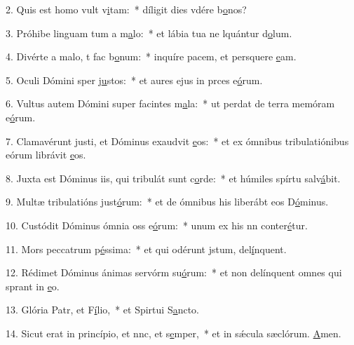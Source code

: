 2. Quis est homo  vult v\uline{i}tam:~* díligit dies vdére b\uline{o}nos?\par 
3. Próhibe linguam tum a m\uline{a}lo:~* et lábia tua ne lquántur d\uline{o}lum.\par 
4. Divérte a malo, t fac b\uline{o}num:~* inquíre pacem, et persquere \uline{e}am.\par 
5. Oculi Dómini sper j\uline{u}stos:~* et aures ejus in prces e\uline{ó}rum.\par 
6. Vultus autem Dómini super facintes m\uline{a}la:~* ut perdat de terra memóram e\uline{ó}rum.\par 
7. Clamavérunt justi, et Dóminus exaudvit \uline{e}os:~* et ex ómnibus tribulatiónibus eórum librávit \uline{e}os.\par 
8. Juxta est Dóminus iis, qui tribulát sunt c\uline{o}rde:~* et húmiles spírtu salv\uline{á}bit.\par 
9. Multæ tribulatións just\uline{ó}rum:~* et de ómnibus his liberábt eos D\uline{ó}minus.\par 
10. Custódit Dóminus ómnia oss e\uline{ó}rum:~* unum ex his nn conter\uline{é}tur.\par 
11. Mors peccatrum p\uline{é}ssima:~* et qui odérunt jstum, del\uline{í}nquent.\par 
12. Rédimet Dóminus ánimas servórm su\uline{ó}rum:~* et non delínquent omnes qui sprant in \uline{e}o.\par 
13. Glória Patr, et F\uline{í}lio,~* et Spirtui S\uline{a}ncto.\par 
14. Sicut erat in princípio, et nnc, et s\uline{e}mper,~* et in sǽcula sæclórum. \uline{A}men.\par 
